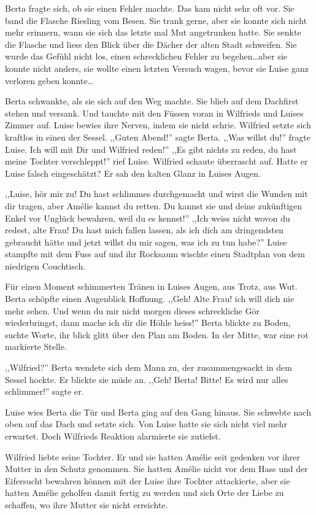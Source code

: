 Berta fragte sich, ob sie einen Fehler machte. Das kam nicht sehr oft vor. Sie band die Flasche Riesling vom Besen. Sie trank gerne, aber sie konnte sich nicht mehr erinnern, wann sie sich das letzte mal Mut angetrunken hatte. Sie senkte die Flasche und liess den Blick über die Dächer der alten Stadt schweifen. Sie wurde das Gefühl nicht los, einen schrecklichen Fehler zu begehen\dots aber sie konnte nicht anders, sie wollte einen letzten Versuch wagen, bevor sie Luise ganz verloren geben konnte\dots 

Berta schwankte, als sie sich auf den Weg machte. Sie blieb auf dem Dachfirst stehen und versank. Und tauchte mit den Füssen voran in Wilfrieds und Luises Zimmer auf. Luise bewies ihre Nerven, indem sie nicht schrie. Wilfried setzte sich kraftlos in einen der Sessel. ,,Guten Abend!'' sagte Berta. ,,Was willst du!'' fragte Luise. Ich will mit Dir und Wilfried reden!'' ,,Es gibt nichts zu reden, du hast meine Tochter verschleppt!'' rief Luise. Wilfried schaute überrascht auf. Hatte er Luise falsch eingeschätzt? Er sah den kalten Glanz in Luises Augen. 

,,Luise, hör mir zu! Du hast schlimmes durchgemacht und wirst die Wunden mit dir tragen, aber Amélie kannst du retten. Du kannst sie und deine zukünftigen Enkel vor Unglück bewahren, weil du es kennst!'' ,,Ich weiss nicht wovon du redest, alte Frau! Du hast mich fallen lassen, als ich dich am dringendsten gebraucht hätte und jetzt willst du mir sagen, was ich zu tun habe?'' Luise stampfte mit dem Fuss auf und ihr Rocksaum wischte einen Stadtplan von dem niedrigen Couchtisch. 

Für einen Moment schimmerten Tränen in Luises Augen, aus Trotz, aus Wut. Berta schöpfte einen Augenblick Hoffnung. ,,Geh! Alte Frau! ich will dich nie mehr sehen. Und wenn du mir nicht morgen dieses schreckliche Gör wiederbringst, dann mache ich dir die Höhle heiss!'' Berta blickte zu Boden, suchte Worte, ihr blick glitt über den Plan am Boden. In der Mitte, war eine rot markierte Stelle. 

,,Wilfried?'' Berta wendete sich dem Mann zu, der zusammengesackt in dem Sessel hockte. Er blickte sie müde an. ,,Geh! Berta! Bitte! Es wird nur alles schlimmer!'' sagte er.

Luise wies Berta die Tür und Berta ging auf den Gang hinaus. Sie schwebte nach oben auf das Dach und setzte sich. Von Luise hatte sie sich nicht viel mehr erwartet. Doch Wilfrieds Reaktion alarmierte sie zutiefst.

Wilfried liebte seine Tochter. Er und sie hatten Amélie seit gedenken vor ihrer Mutter in den Schutz genommen. Sie hatten Amélie nicht vor dem Hass und der Eifersucht bewahren können mit der Luise ihre Tochter attackierte, aber sie hatten Amélie geholfen damit fertig zu werden und sich Orte der Liebe zu schaffen, wo ihre Mutter sie nicht erreichte.

